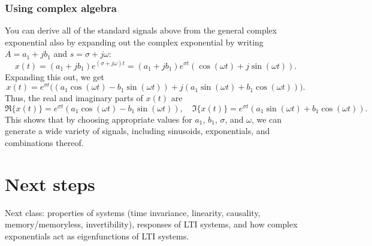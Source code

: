 \documentclass{ee102_notes}
\begin{document}
\subsubsection{Using complex algebra}
You can derive all of the standard signals above from the general complex exponential also by expanding out the complex exponential by writing $A = a_1 + j b_1$ and $s = \sigma + j\omega$:
\[
x(t) = (a_1 + j b_1) e^{(\sigma + j\omega) t} = (a_1 + j b_1) e^{\sigma t} (\cos(\omega t) + j \sin(\omega t)).
\]
Expanding this out, we get
\[
x(t) = e^{\sigma t} \big( (a_1 \cos(\omega t) - b_1 \sin(\omega t)) + j (a_1 \sin(\omega t) + b_1 \cos(\omega t)) \big).
\]
Thus, the real and imaginary parts of $x(t)$ are
\[
\Re\{x(t)\} = e^{\sigma t} (a_1 \cos(\omega t) - b_1 \sin(\omega t)), \quad \Im\{x(t)\} = e^{\sigma t} (a_1 \sin(\omega t) + b_1 \cos(\omega t)).
\]
This shows that by choosing appropriate values for $a_1$, $b_1$, $\sigma$, and $\omega$, we can generate a wide variety of signals, including sinusoids, exponentials, and combinations thereof.
\section*{Next steps}
Next class: properties of systems (time invariance, linearity, causality, memory/memoryless, invertibility), responses of LTI systems, and how complex exponentials act as eigenfunctions of LTI systems.
\end{document}
